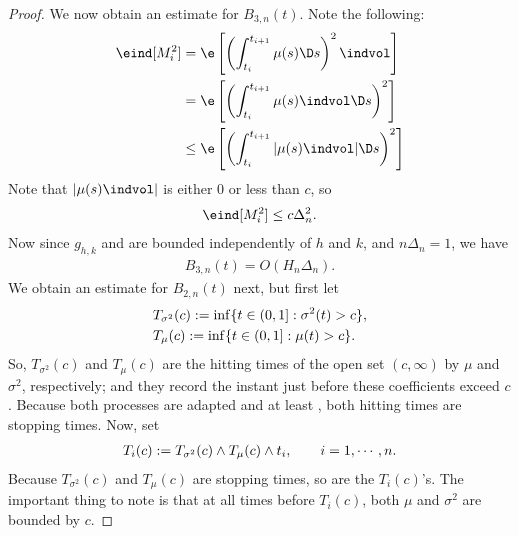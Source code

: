 \begin{appendices}
\begin{proof}
We now obtain an estimate for  $B_{3,n}(t)$. Note the following:
\begin{align}
  \eind[ M_i^2] & = \e\left[\left(\int_{t_i}^{t_{i+1}} \mu(s) \D s\right)^2\indvol\right] \notag\\
  & = \e\left[\left(\int_{t_i}^{t_{i+1}} \mu(s)\indvol \D s\right)^2\right] \notag\\
& \le \e\left[\left(\int_{t_i}^{t_{i+1}}\vert \mu(s)\indvol\vert \D s\right)^2\right] \notag
  \label{}
\end{align}
Note that $\vert\mu(s)\indvol\vert$ is either 0 or less than $c$, so   
\begin{align}
 \eind[ M_i^2] \le c \Delta_n^2. 
  \label{eq:msq}
\end{align}
 Now since  $g_{h,k}$ and \tghk  are bounded independently of $h$ and $k$, and $n\Delta_n = 1$, we have
\begin{align}
  B_{3,n}(t) = O( H_n \Delta_n).
  \label{}
\end{align}
We obtain an estimate for $B_{2,n}(t)$ next, but first let 
\begin{align}
&T_{\sigma^2}(c)   := \inf\{t \in  (0,1]: \sigma^2(t) > c\}, \\ 
  &T_{\mu}(c)  := \inf\{t \in (0,1]: \mu(t) > c\}. \notag
  \label{}
\end{align}
So, $T_{\sigma^2}(c)$ and $T_{\mu}(c)$ are the hitting times of the open set $(c, \infty)$ by $\mu$ and $\sigma^2$, respectively; and they record the instant just before these coefficients exceed $c$. Because both processes are adapted and at least \cadlag, both hitting times  are stopping times. Now, set 
\begin{align}
T_i(c)  :=  T_{\sigma^2}(c) \wedge  T_{\mu}(c) \wedge  t_i, \qquad i= 1, \cdots, n. \notag
\end{align}
Because  $T_{\sigma^2}(c)$ and   $T_{\mu}(c)$ are stopping times, so are the  $T_i(c)$'s. The important thing to note is that at all times before  $T_i(c)$, both $\mu$ and $\sigma^2$ are bounded by $c$.  


\end{proof}
\end{appendices}
